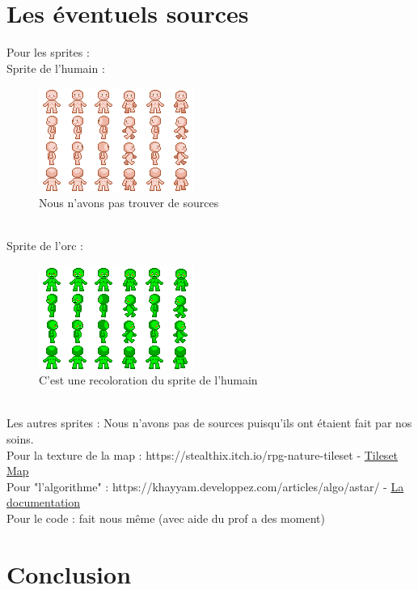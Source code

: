 \documentclass[a4paper, 11pt]{article}
\begin{document}
\section{Les éventuels sources}

Pour les sprites : \\
		 Sprite de l'humain :
\begin{figure}[ht!]
 \centering
 \includegraphics[width=0.5\linewidth]{images/human.png}
 \caption{Nous n'avons pas trouver de sources}
 \label{fig::example::one}
\end{figure}
\\
		 Sprite de l'orc :
\begin{figure}[ht!]
 \centering
 \includegraphics[width=0.5\linewidth]{images/orc.png}
 \caption{C'est une recoloration du sprite de l'humain}
 \label{fig::example::one}
\end{figure}
\\
		 Les autres sprites : Nous n'avons pas de sources puisqu'ils ont étaient fait par nos soins.\\
Pour la texture de la map : https://stealthix.itch.io/rpg-nature-tileset  - \href{https://stealthix.itch.io/rpg-nature-tileset}{Tileset Map}\\
Pour "l'algorithme" : https://khayyam.developpez.com/articles/algo/astar/ - \href{https://khayyam.developpez.com/articles/algo/astar/}{La documentation}\\
Pour le code : fait nous même (avec aide du prof a des moment)\\

\newpage

\section{Conclusion}
\end{document}
